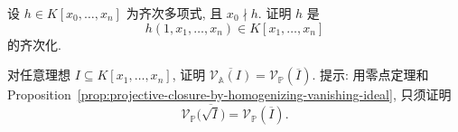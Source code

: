 \begin{BookExercises}
\begin{enumerate}
  \end{enumerate}
  \item\label{ex:recover-homogeneous-polynomial-not-divisible-by-first-coordinate} 设 $h\in K[x_{0},\ldots,x_{n}]$ 为齐次多项式, 且 $x_{0}\nmid h$. 证明 $h$ 是
  \[
    h(1,x_{1},\ldots,x_{n})\in K[x_{1},\ldots,x_{n}]
  \]
  的齐次化.
  \item\label{ex:closure-of-affine-ideal-variety-via-homogenization} 对任意理想 $I\subseteq K[x_{1},\ldots,x_{n}]$, 证明 $\overline{\mathcal{V}_{\mathbb{A}}(I)}=\mathcal{V}_{\mathbb{P}}(\overline{I})$. 提示: 用零点定理和 Proposition~\ref{prop:projective-closure-by-homogenizing-vanishing-ideal}, 只须证明
  \[
    \mathcal{V}_{\mathbb{P}}\bigl(\overline{\sqrt{I}}\bigr)=\mathcal{V}_{\mathbb{P}}(\overline{I}).
  \]
\end{BookExercises}

